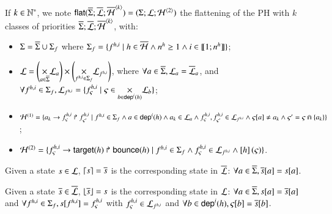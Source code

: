 \newcommand{\flats}[1]{\lfloor #1 \rfloor}
\newcommand{\unflats}[1]{\lceil #1 \rceil}

\newcommand{\os}{\ov{s}}
\newcommand{\oPH}{\ov{\PH}}

\begin{definition}
  \label{def:flattening}
  If $k \in \mathbb{N}^*$, we note $\mathsf{flat}(\overline{\Sigma}; \overline{\mathcal{L}}; \overline{\mathcal{H}}^{{\langle k \rangle}}) = (\Sigma; \mathcal{L}; \mathcal{H}^{{\langle 2 \rangle}})$
  the flattening of the PH with $k$ classes of priorities $\overline{\Sigma}; \overline{\mathcal{L}}; \overline{\mathcal{H}}^{{\langle k \rangle}}$, with:
  \begin{itemize}
    \item $\Sigma = \overline{\Sigma} \cup \Sigma_f$
      where $\Sigma_f = \{ f^{h,i} \mid h \in \overline{\mathcal{H}} \wedge n^{h} \geq 1 \wedge i \in \llbracket 1; n^{h} \rrbracket \}$;
    \item $\mathcal{L} = \left( \underset{a \in \overline{\Sigma}}{\times} \mathcal{L}_{a} \right) \times
      \left(\underset{f^{h,i} \in \Sigma_f}{\times} \mathcal{L}_{f^{h,i}} \right)$,
      where $\forall a \in \overline{\Sigma}, \mathcal{L}_{a} = \overline{\mathcal{L}}_{a}$, and
      $\forall f^{h,i} \in \Sigma_f,
      \mathcal{L}_{f^{h,i}} = \{ f^{h,i}_\varsigma \mid \varsigma \in \underset{b \in \mathsf{dep}^{i}(h)}{\times} \mathcal{L}_{b} \}$;
    \item $\mathcal{H}^{(1)} = \{ a_k\rightarrow f^{h,i}_\varsigma\Rsh f^{h,i}_{\varsigma'} \mid
      f^{h,i} \in \Sigma_f \wedge
      a \in \mathsf{dep}^{i}(h) \wedge a_k \in \mathcal{L}_a \wedge
      f^{h,i}_\varsigma , f^{h,i}_{\varsigma'} \in \mathcal{L}_{f^{h,i}} \wedge
      {\varsigma[a]} \neq a_k \wedge \varsigma' = \varsigma \Cap \{ a_k \} \}$;
    \item $\mathcal{H}^{(2)}=\{ f^{h,i}_\varsigma\rightarrow\mathsf{target}(h)\Rsh\mathsf{bounce}(h) \mid
      f^{h,i} \in \Sigma_f \wedge
      f^{h,i}_\varsigma \in \mathcal{L}_{f^{h,i}} \wedge \left[h\right](\varsigma) \}$.
  \end{itemize}
  Given a state $s \in \mathcal{L}$, $\unflats{s} = \os$ is the corresponding state in $\overline{\mathcal{L}}$:
  $\forall a \in \ov{\PHs}, \PHget{\os}{a} = \PHget{s}{a}$.

  \noindent
  Given a state $\os \in \ov{\PHl}$, $\flats{\os} = s$ is the corresponding state in $\mathcal{L}$:
  $\forall a \in \ov{\PHs}, \PHget{s}{a} = \PHget{\os}{a}$
  and $\forall f^{h,i} \in \Sigma_f, {s[f^{h,i}]} = f^{h,i}_\varsigma$ with $f^{h,i}_\varsigma \in \mathcal{L}_{f^{h,i}}$
  and $\forall b \in \PHdep{i}{h}, \PHget{\varsigma}{b} = \PHget{\os}{b}$.
\end{definition}




